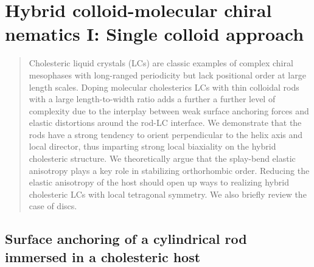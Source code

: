 
\chapter{Hybrid colloid-molecular chiral nematics I: Single colloid approach}


\begin{abstract}
Cholesteric liquid crystals (LCs) are classic examples of complex chiral mesophases with long-ranged periodicity but lack positional order at large length scales. Doping molecular cholesterics LCs with thin colloidal rods with a large  length-to-width ratio adds a further a further level of complexity due to the interplay between weak surface anchoring forces and elastic distortions around the rod-LC interface. We demonstrate that the rods have a strong tendency to orient perpendicular to the helix axis and local director, thus imparting strong local biaxiality on the hybrid cholesteric structure. We theoretically argue that the splay-bend elastic anisotropy plays a key role in stabilizing orthorhombic order. Reducing the elastic anisotropy of the host should open up ways to realizing hybrid cholesteric LCs with local tetragonal symmetry.    We also briefly review the case of discs.

\end{abstract}


\section[Surface anchoring of a cylindrical rod]{Surface anchoring of a cylindrical rod immersed in a cholesteric host}


